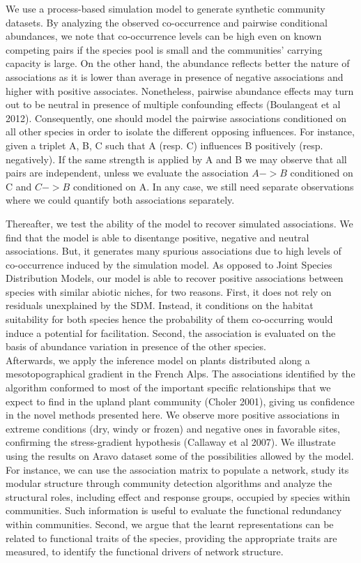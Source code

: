 \documentclass[]{article}
\begin{document}
We use a process-based simulation model to generate synthetic community datasets. By analyzing the observed co-occurrence and pairwise conditional abundances, we note that co-occurrence levels can be high even on known competing pairs if the species pool is small and the communities' carrying capacity is large. On the other hand, the abundance reflects better the nature of associations as it is lower than average in presence of negative associations and higher with positive associates. Nonetheless, pairwise abundance effects may turn out to be neutral in presence of multiple confounding effects (Boulangeat et al 2012). Consequently, one should model the pairwise associations conditioned on all other species in order to isolate the different opposing influences. For instance, given a triplet A, B, C such that A (resp. C) influences B positively (resp. negatively). If the same strength is applied by A and B we may observe that all pairs are independent, unless we evaluate the association $ A -> B $ conditioned on C and $C -> B$ conditioned on A. In any case, we still need separate observations where we could quantify both associations separately. 

Thereafter, we test the ability of the model to recover simulated associations. We find that the model is able to disentange positive, negative and neutral associations. But, it generates many spurious associations due to high levels of co-occurrence induced by the simulation model. As opposed to Joint Species Distribution Models, our model is able to recover positive associations between species with similar abiotic niches, for two reasons. First, it does not rely on residuals unexplained by the SDM. Instead, it conditions on the habitat suitability for both species hence the probability of them co-occurring would induce a potential for facilitation. Second, the association is evaluated on the basis of abundance variation in presence of the other species. \\ 

Afterwards, we apply the inference model on plants distributed along a mesotopographical gradient in the French Alps. The associations identified by the algorithm conformed to most of the important specific relationships that we expect to find in the upland plant community (Choler 2001), giving us confidence in the novel methods presented here. We observe more positive associations in extreme conditions (dry, windy or frozen) and negative ones in favorable sites, confirming the stress-gradient hypothesis (Callaway et al 2007). We illustrate using the results on Aravo dataset some of the possibilities allowed by the model. For instance, we can use the association matrix to populate a network, study its modular structure through community detection algorithms and analyze the structural roles, including effect and response groups, occupied by species within communities. Such information is useful to evaluate the functional redundancy within communities. Second, we argue that the learnt representations can be related to functional traits of the species, providing the appropriate traits are measured, to identify the functional drivers of network structure. 
\end{document}
